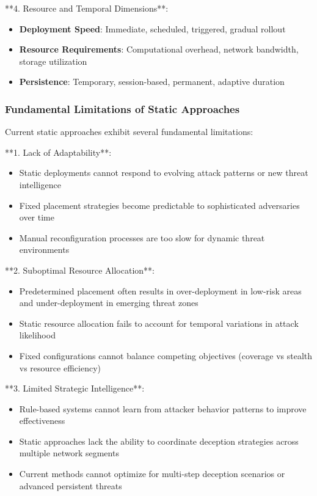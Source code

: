 \documentclass[12pt,twoside]{article}
\theoremstyle{definition}
\theoremstyle{plain}
\begin{document}
**4. Resource and Temporal Dimensions**:
\begin{itemize}
\item \textbf{Deployment Speed}: Immediate, scheduled, triggered, gradual rollout
\item \textbf{Resource Requirements}: Computational overhead, network bandwidth, storage utilization
\item \textbf{Persistence}: Temporary, session-based, permanent, adaptive duration
\end{itemize}

\subsubsection{Fundamental Limitations of Static Approaches}

Current static approaches exhibit several fundamental limitations:

**1. Lack of Adaptability**:
\begin{itemize}
\item Static deployments cannot respond to evolving attack patterns or new threat intelligence
\item Fixed placement strategies become predictable to sophisticated adversaries over time
\item Manual reconfiguration processes are too slow for dynamic threat environments
\end{itemize}

**2. Suboptimal Resource Allocation**:
\begin{itemize}
\item Predetermined placement often results in over-deployment in low-risk areas and under-deployment in emerging threat zones
\item Static resource allocation fails to account for temporal variations in attack likelihood
\item Fixed configurations cannot balance competing objectives (coverage vs stealth vs resource efficiency)
\end{itemize}

**3. Limited Strategic Intelligence**:
\begin{itemize}
\item Rule-based systems cannot learn from attacker behavior patterns to improve effectiveness
\item Static approaches lack the ability to coordinate deception strategies across multiple network segments
\item Current methods cannot optimize for multi-step deception scenarios or advanced persistent threats
\end{itemize}
\end{document}
